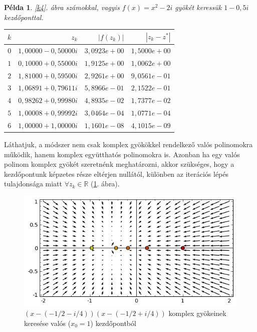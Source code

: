 \documentclass[a4paper,12pt]{report}
\newtheorem{Pl}[Tet]{Példa}
\begin{document}
			\begin{Pl}
				\ref{k4}. ábra számokkal, vagyis $f(x)=x^2-2i$ gyökét keressük $1-0,\!5i$ kezdőponttal.
				\begin{center}
					\begin{tabular}{|r|r|r|r|}
						\hline
						$k$ & $z_k$                & $|f(z_k)|$    & $|z_k-z^*|$  \\ \hline
						$0$ & $1,\!00000 - 0,\!50000i$ & $3,\!0923e+00$  & $1,\!5000e+00$ \\
						$1$ & $0,\!10000 + 0,\!55000i$ & $1,\!9125e+00$  & $1,\!0062e+00$ \\
						$2$ & $1,\!81000 + 0,\!59500i$ & $2,\!9261e+00$  & $9,\!0561e-01$ \\
						 $3$ & $1,\!06891 + 0,\!79611i$ & $5,\!8966e-01$  & $2,\!1522e-01$ \\
						$4$ & $0,\!98262 + 0,\!99980i$ & $4,\!8935e-02$  & $1,\!7377e-02$ \\
						$5$ & $1,\!00008 + 0,\!99992i$ & $3,\!0464e-04$  & $1,\!0771e-04$ \\
						$6$ & $1,\!00000 + 1,\!00000i$ & $1,\!1601e-08$  & $4,\!1015e-09$ \\
						\hline
					\end{tabular}
				\end{center}
			\end{Pl}
			Láthatjuk, a módszer nem csak komplex gyökökkel rendelkező valós polinomokra működik, hanem komplex együtthatós polinomokra is. Azonban ha egy valós polinom komplex gyökét szeretnénk meghatározni, akkor szükséges, hogy a kezdőpontunk képzetes része eltérjen nullától, különben az iterációs lépés tulajdonsága miatt $\forall z_k\in \mathbb{R}$ (\ref{k5}. ábra).

			\begin{figure}[ht]
				\begin{center}
				\includegraphics[scale=0.62]{kepek/kep5.png}
				\caption{$(x-( - 1/2-i/4)) (x-( - 1/2+i/4))$ komplex gyökeinek keresése valós ($x_0=1$) kezdőpontból} \label{k5}
				\end{center}
			\end{figure}
\end{document}

